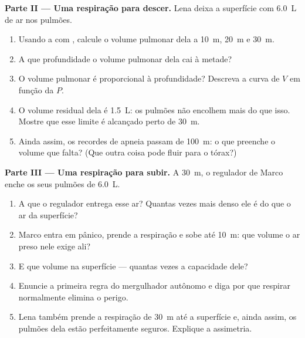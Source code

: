 \begin{problem}
\medskip
\noindent\textbf{Parte II --- Uma respiração para descer.}
Lena deixa a superfície com \qty{6.0}{L} de ar nos pulmões.
\begin{enumerate}[resume]
  \item Usando a  com , calcule o volume
        pulmonar dela a \qty{10}{m}, \qty{20}{m} e \qty{30}{m}.
  \item A que profundidade o volume pulmonar dela cai à metade?
  \item O volume pulmonar é proporcional à profundidade? Descreva a curva
        de $V$ em função da  $P$.
  \item O volume residual dela é \qty{1.5}{L}: os pulmões não encolhem
        mais do que isso. Mostre que esse limite é alcançado perto de
        \qty{30}{m}.
  \item Ainda assim, os recordes de apneia passam de \qty{100}{m}: o que
        preenche o volume que falta? (Que outra coisa pode fluir para o
        tórax?)
\end{enumerate}

\medskip
\noindent\textbf{Parte III --- Uma respiração para subir.}
A \qty{30}{m}, o regulador de Marco enche os seus pulmões de
\qty{6.0}{L}.
\begin{enumerate}[resume]
  \item A que  o regulador entrega esse ar? Quantas vezes mais
        denso ele é do que o ar da superfície?
  \item Marco entra em pânico, prende a respiração e sobe até
        \qty{10}{m}: que volume o ar preso nele exige ali?
  \item E que volume na superfície --- quantas vezes a capacidade dele?
  \item Enuncie a primeira regra do mergulhador autônomo e diga por que
        respirar normalmente elimina o perigo.
  \item Lena também prende a respiração de \qty{30}{m} até a superfície e,
        ainda assim, os pulmões dela estão perfeitamente seguros. Explique
        a assimetria.
\end{enumerate}


\end{problem}
